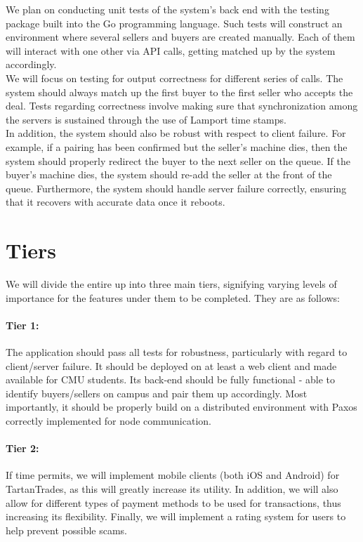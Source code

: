 \documentclass[12pt]{article}
\begin{document}
We plan on conducting unit tests of the system's back end with the testing package built into the Go programming language. Such tests will construct an environment where several sellers and buyers are created manually. Each of them will interact with one other via API calls, getting matched up by the system accordingly.\\

We will focus on testing for output correctness for different series of calls. The system should always match up the first buyer to the first seller who accepts the deal. Tests regarding correctness involve making sure that synchronization among the servers is sustained through the use of Lamport time stamps.\\

In addition, the system should also be robust with respect to client failure. For example, if a pairing has been confirmed but the seller's machine dies, then the system should properly redirect the buyer to the next seller on the queue. If the buyer's machine dies, the system should re-add the seller at the front of the queue. Furthermore, the system should handle server failure correctly, ensuring that it recovers with accurate data once it reboots.\\

\section{Tiers}

We will divide the entire up into three main tiers, signifying varying levels of importance for the features under them to be completed. They are as follows:

\paragraph{Tier 1:}
The application should pass all tests for robustness, particularly with regard to client/server failure. It should be deployed on at least a web client and made available for CMU students. Its back-end should be fully functional - able to identify buyers/sellers on campus and pair them up accordingly. Most importantly, it should be properly build on a distributed environment with Paxos correctly implemented for node communication.

\paragraph{Tier 2:}
If time permits, we will implement mobile clients (both iOS and Android) for TartanTrades, as this will greatly increase its utility. In addition, we will also allow for different types of payment methods to be used for transactions, thus increasing its flexibility. Finally, we will implement a rating system for users to help prevent possible scams.
\end{document}
